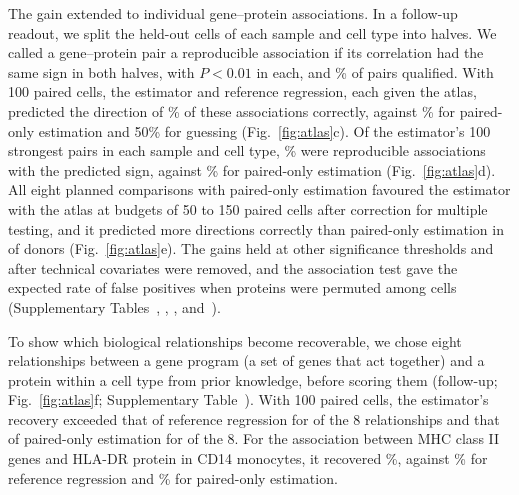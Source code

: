 \documentclass[pdflatex,sn-vancouver-num,iicol]{sn-jnl}
\begin{document}
The gain extended to individual gene--protein associations. In a follow-up readout, we split the held-out cells of each sample and cell type into halves. We called a gene--protein pair a reproducible association if its correlation had the same sign in both halves, with $P<0.01$ in each, and \BoRepShare\% of pairs qualified. With 100 paired cells, the estimator and reference regression, each given the atlas, predicted the direction of \BoOneAtlasHundred\% of these associations correctly, against \BoOnePoHundred\% for paired-only estimation and 50\% for guessing (Fig.~\ref{fig:atlas}c). Of the estimator's 100 strongest pairs in each sample and cell type, \BoTwoAtlasHundred\% were reproducible associations with the predicted sign, against \BoTwoPoHundred\% for paired-only estimation (Fig.~\ref{fig:atlas}d). All eight planned comparisons with paired-only estimation favoured the estimator with the atlas at budgets of 50 to 150 paired cells after correction for multiple testing, and it predicted more directions correctly than paired-only estimation in \RvDonorBetterPo{} of \RvDonorN{} donors (Fig.~\ref{fig:atlas}e). The gains held at other significance thresholds and after technical covariates were removed, and the association test gave the expected rate of false positives when proteins were permuted among cells (Supplementary Tables~, , ,  and~).

To show which biological relationships become recoverable, we chose eight relationships between a gene program (a set of genes that act together) and a protein within a cell type from prior knowledge, before scoring them (follow-up; Fig.~\ref{fig:atlas}f; Supplementary Table~). With 100 paired cells, the estimator's recovery exceeded that of reference regression for \RvRelBetterReg{} of the 8 relationships and that of paired-only estimation for \RvRelBetterPo{} of the 8. For the association between MHC class II genes and HLA-DR protein in CD14 monocytes, it recovered \RvRelTwoAtlasRf\%, against \RvRelTwoRegRf\% for reference regression and \RvRelTwoPoRf\% for paired-only estimation.
\end{document}

